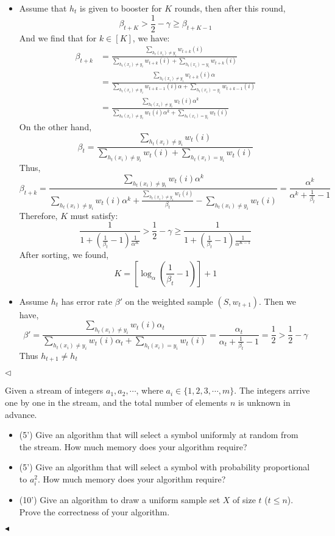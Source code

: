 \documentclass[11pt]{article}
\newenvironment{problem}[2][Problem]{\begin{trivlist}
\item[\hskip \labelsep {\bfseries #1}\hskip \labelsep {\bfseries #2.}]}{\hfill$\blacktriangleleft$\end{trivlist}}
\newenvironment{answer}[1][Answer]{\begin{trivlist}
\item[\hskip \labelsep {\bfseries #1.}\hskip \labelsep]}{\hfill$\lhd$\end{trivlist}}
\begin{document}
\begin{answer}
\begin{itemize}
    \item [(1)] Assume that $h_t$ is given to booster for $K$ rounds, then after this round, 
    $$\beta_{t+K}>\frac{1}{2}-\gamma\ge \beta_{t+K-1}$$
    And we find that for $k\in [K]$, we have:
    $$\begin{align*}\beta_{t+k} &= \frac{\sum_{h_{t}(x_i)\neq y_i} w_{t+k}(i)}{\sum_{h_{t}(x_i)\neq y_i} w_{t+k}(i)+\sum_{h_{t}(x_i) = y_i} w_{t+k}(i)} \\&= \frac{\sum_{h_{t}(x_i)\neq y_i} w_{t+k}(i)\alpha}{\sum_{h_{t}(x_i)\neq y_i} w_{t+k-1}(i)\alpha+\sum_{h_{t}(x_i) = y_i} w_{t+k-1}(i)} \\&= \frac{\sum_{h_{t}(x_i)\neq y_i} w_{t}(i)\alpha^k}{\sum_{h_{t}(x_i)\neq y_i} w_{t}(i)\alpha^{k}+\sum_{h_{t}(x_i) = y_i} w_{t}(i)}\end{align*}$$
    On the other hand, 
    $$\beta_t = \frac{\sum_{h_{t}(x_i)\neq y_i} w_{t}(i)}{\sum_{h_{t}(x_i)\neq y_i} w_{t}(i)+\sum_{h_{t}(x_i) = y_i} w_{t}(i)}$$
    Thus, 
    $$\beta_{t+k} = \frac{\sum_{h_{t}(x_i)\neq y_i} w_{t}(i)\alpha^k}{\sum_{h_{t}(x_i)\neq y_i} w_{t}(i)\alpha^{k}+\frac{\sum_{h_{t}(x_i)\neq y_i} w_{t}(i)}{\beta_t}-\sum_{h_{t}(x_i)\neq y_i} w_{t}(i)} = \frac{\alpha^{k}}{\alpha^k+\frac{1}{\beta_t}-1}$$
    Therefore, $K$ must satisfy:
    $$\frac{1}{1+(\frac{1}{\beta_t}-1)\frac{1}{\alpha^{K}}}>\frac{1}{2}-\gamma\ge\frac{1}{1+(\frac{1}{\beta_t}-1)\frac{1}{\alpha^{K-1}}}$$
    After sorting, we found,
    $$K = \left[\log_{\alpha}\left(\frac{1}{\beta_t}-1\right)\right]+1$$
    \item [(2)]
    Assume $h_t$ has error rate $\beta'$ on the weighted sample $(S,w_{t+1})$. Then we have,
$$\beta' = \frac{\sum_{h_{t}(x_i)\neq y_i} w_{t}(i)\alpha_t}{\sum_{h_{t}(x_i)\neq y_i} w_{t}(i)\alpha_t+\sum_{h_{t}(x_i) = y_i} w_{t}(i)} = \frac{\alpha_t}{\alpha_t+\frac{1}{\beta_t}-1} = \frac{1}{2}>\frac{1}{2}-\gamma$$
    Thus $h_{t+1}\neq h_t$
\end{itemize}
\end{answer}

\begin{problem}{3 (20')} 
Given a stream of integers $a_1,a_2,\cdots$, where $a_i\in\{1,2,3,\cdots,m\}$. The integers arrive one by one in the stream, and the total number of elements $n$ is unknown in advance. 
\begin{itemize}
    \item [(1)] (5') Give an algorithm that will select a symbol uniformly at random from the stream. How much memory does your algorithm require?
    \item [(2)] (5') Give an algorithm that will select a symbol with probability proportional to $a_i^2$. How much memory does your algorithm require?
    \item [(3)] (10') Give an algorithm to draw a uniform sample set $X$ of size $t$ ($t\leq n$). Prove the correctness of your algorithm.
\end{itemize}
\end{problem}
\end{document}
